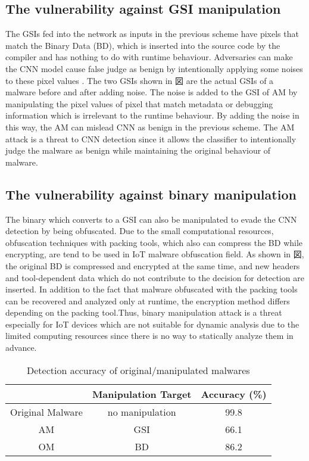 \subsection{The vulnerability against GSI manipulation}
The GSIs fed into the network as inputs in the previous scheme have pixels that match the Binary Data (BD), which is inserted into the source code by the compiler and has nothing to do with runtime behaviour.
Adversaries can make the CNN model cause false judge as benign by intentionally applying some noises to these pixel values \cite{AM}.
The two GSIs shown in 図 are the actual GSIs of a malware before and after adding noise.
The noise is added to the GSI of AM by manipulating the pixel values of pixel that match metadata or debugging information which is irrelevant to the runtime behaviour.
By adding the noise in this way, the AM can mislead CNN as benign in the previous scheme.
The AM attack is a threat to CNN detection since it allows the classifier to intentionally judge the malware as benign while maintaining the original behaviour of malware.

\subsection{The vulnerability against binary manipulation}
The binary which converts to a GSI can also be manipulated to evade the CNN detection by being obfuscated.
Due to the small computational resources, obfuscation techniques with packing tools, which also can compress the BD while encrypting, are tend to be used in IoT malware obfuscation field.
As shown in 図, the original BD is compressed and encrypted at the same time, and new headers and tool-dependent data which do not contribute to the decision for detection are inserted.
In addition to the fact that malware obfuscated with the packing tools can be recovered and analyzed only at runtime, the encryption method differs depending on the packing tool.Thus, binary manipulation attack is a threat especially for IoT devices which are not suitable for dynamic analysis due to the limited computing resources since there is no way to statically analyze them in advance.

\begin{table}[p]
  \begin{center}
    \caption{Detection accuracy of original/manipulated malwares}
    \label{tab:prev} 
    \begin{tabular}{|c|c|c|} \hline
       & Manipulation Target & Accuracy (\%) \\ \hline \hline
      Original Malware & no manipulation  & 99.8  \\ \hline
      AM & GSI & 66.1  \\ \hline 
      OM & BD & 86.2 \\ \hline
    \end{tabular}
  \end{center}
\end{table} 
\afterpage{\clearpage}
\newpage

